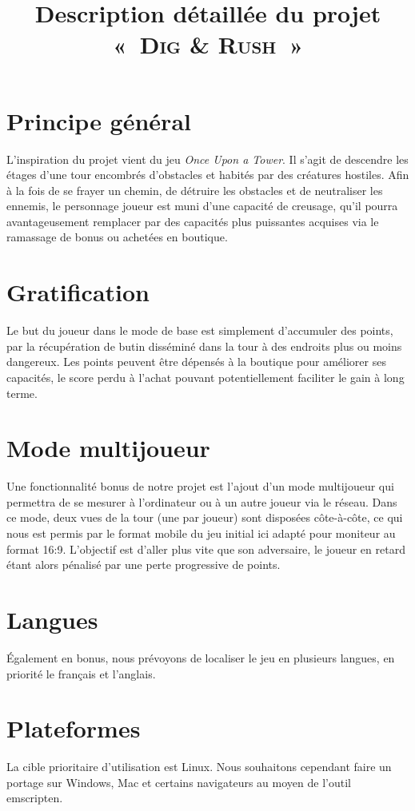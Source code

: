 \documentclass[10pt]{article}
\title{Description détaillée du projet « \textsc{Dig \& Rush} »}
\date{}
\begin{document}
\maketitle

\section{Principe général}
L’inspiration du projet vient du jeu \textit{Once Upon a Tower}. Il s’agit de descendre les étages d’une tour encombrés d’obstacles et habités par des créatures hostiles.
Afin à la fois de se frayer un chemin, de détruire les obstacles et de neutraliser les ennemis, le personnage joueur est muni d’une capacité de creusage, qu’il pourra avantageusement remplacer par des capacités plus puissantes acquises via le ramassage de bonus ou achetées en boutique.

\section{Gratification}
Le but du joueur dans le mode de base est simplement d’accumuler des points, par la récupération de butin disséminé dans la tour à des endroits plus ou moins dangereux.
Les points peuvent être dépensés à la boutique pour améliorer ses capacités, le score perdu à l’achat pouvant potentiellement faciliter le gain à long terme.

\section{Mode multijoueur}
Une fonctionnalité bonus de notre projet est l’ajout d’un mode multijoueur qui permettra de se mesurer à l’ordinateur ou à un autre joueur via le réseau.
Dans ce mode, deux vues de la tour (une par joueur) sont disposées côte-à-côte, ce qui nous est permis par le format mobile du jeu initial ici adapté pour moniteur au format 16:9.
L’objectif est d’aller plus vite que son adversaire, le joueur en retard étant alors pénalisé par une perte progressive de points.

\section{Langues}
Également en bonus, nous prévoyons de localiser le jeu en plusieurs langues, en priorité le français et l’anglais.

\section{Plateformes}
La cible prioritaire d’utilisation est Linux. Nous souhaitons cependant faire un portage sur Windows, Mac et certains navigateurs au moyen de l’outil emscripten.
\end{document}
